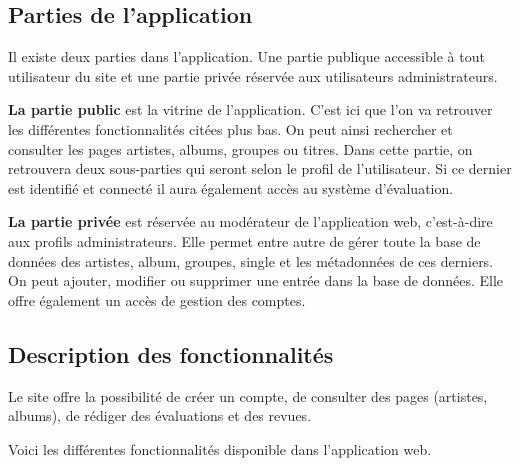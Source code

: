     \subsection{Parties de l'application}

        \begin{paragraphe}
            Il existe deux parties dans l'application. Une partie publique accessible à tout utilisateur du site et une partie
            privée réservée aux utilisateurs administrateurs.
        \end{paragraphe}

        \begin{paragraphe}
            \textbf{La partie public} est la vitrine de l'application. C'est ici que l'on
            va retrouver les différentes fonctionnalités citées plus bas. On peut
            ainsi rechercher et consulter les pages artistes, albums, groupes ou titres.
            Dans cette partie, on retrouvera deux sous-parties qui seront selon le profil de
            l'utilisateur.
            Si ce dernier est identifié et connecté il aura également accès au système d'évaluation.
        \end{paragraphe}

        \begin{paragraphe}
            \textbf{La partie privée} est réservée au modérateur de l'application web, c'est-à-dire 
            aux profils administrateurs.
            Elle permet entre autre de gérer toute la base de données des artistes,
            album, groupes, single et les métadonnées de ces derniers. On peut ajouter, modifier
            ou supprimer une entrée dans la base de données.
            Elle offre également un accès de gestion des comptes.
        \end{paragraphe}

    \subsection{Description des fonctionnalités}

        \begin{paragraphe}
            Le site offre la possibilité de créer un compte, de consulter des pages
            (artistes, albums), de rédiger des évaluations et des revues.
        \end{paragraphe}

        \begin{paragraphe}
            Voici les différentes fonctionnalités disponible dans l'application web.
        \end{paragraphe}

